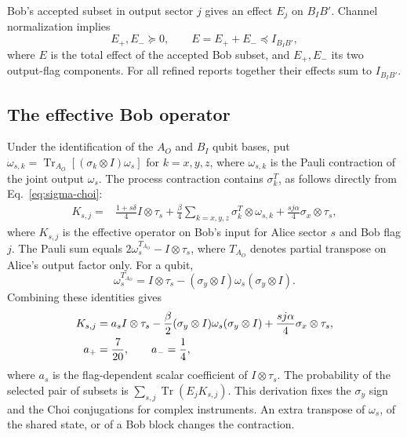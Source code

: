 \documentclass[11pt]{article}
\newcommand{\Tr}{\operatorname{Tr}}
\begin{document}
Bob's accepted subset in output sector $j$ gives an effect $E_j$ on $B_IB'$. Channel normalization implies
\begin{equation}
 E_+,E_-\succeq0,\qquad E=E_++E_-\preceq I_{B_IB'},
 \label{eq:bob-effects}
\end{equation}
where $E$ is the total effect of the accepted Bob subset, and $E_+,E_-$ its two output-flag components. For all refined reports together their effects sum to $I_{B_IB'}$.

\subsection{The effective Bob operator}
Under the identification of the $A_O$ and $B_I$ qubit bases, put $\omega_{s,k}=\Tr_{A_O}[(\sigma_k\otimes I)\omega_s]$ for $k=x,y,z$, where $\omega_{s,k}$ is the Pauli contraction of the joint output $\omega_s$. The process contraction contains $\sigma_k^T$, as follows directly from Eq.~\eqref{eq:sigma-choi}:
\begin{align}
 K_{s,j}={}&\frac{1+s\delta}{4}I\otimes\tau_s
     +\frac\beta4\sum_{k=x,y,z}\sigma_k^T\otimes\omega_{s,k}
     +\frac{s j\alpha}{4}\sigma_x\otimes\tau_s,\label{eq:kernel-pauli}
\end{align}
where $K_{s,j}$ is the effective operator on Bob's input for Alice sector $s$ and Bob flag $j$. The Pauli sum equals $2\omega_s^{T_{A_O}}-I\otimes\tau_s$, where $T_{A_O}$ denotes partial transpose on Alice's output factor only. For a qubit,
\begin{equation}
 \omega_s^{T_{A_O}}=I\otimes\tau_s
                 -(\sigma_y\otimes I)\omega_s(\sigma_y\otimes I).
 \label{eq:qubit-transpose}
\end{equation}
Combining these identities gives
\begin{align}
 K_{s,j}={}&a_s I\otimes\tau_s
       -\frac\beta2(\sigma_y\otimes I)\omega_s(\sigma_y\otimes I)
       +\frac{s j\alpha}{4}\sigma_x\otimes\tau_s,\notag\\
 a_+={}&\frac7{20},\qquad a_- =\frac14,
 \label{eq:kernel}
\end{align}
where $a_s$ is the flag-dependent scalar coefficient of $I\otimes\tau_s$. The probability of the selected pair of subsets is $\sum_{s,j}\Tr(E_jK_{s,j})$. This derivation fixes the $\sigma_y$ sign and the Choi conjugations for complex instruments. An extra transpose of $\omega_s$, of the shared state, or of a Bob block changes the contraction.
\end{document}
